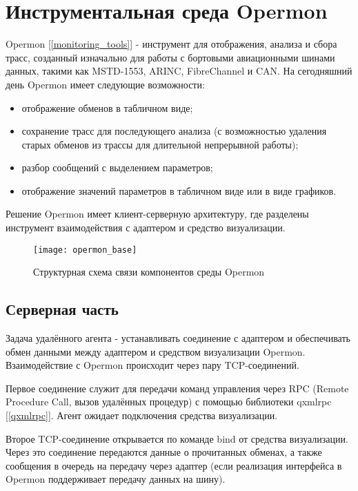 \section{Инструментальная среда Opermon}

Opermon [\ref{monitoring_tools}] - инструмент для отображения, анализа и сбора трасс, созданный изначально для работы с бортовыми авиационными шинами данных, такими как MSTD-1553, ARINC, FibreChannel и CAN. На сегодняшний день Opermon имеет следующие возможности:

\begin{itemize}
 \item отображение обменов в табличном виде;
 \item сохранение трасс для последующего анализа (с возможностью удаления старых обменов из трассы для длительной непрерывной работы);
 \item разбор сообщений с выделением параметров;
 \item отображение значений параметров в табличном виде или в виде графиков.
\end{itemize}

Решение Opermon имеет клиент-серверную архитектуру, где разделены инструмент взаимодействия с адаптером и средство визуализации. 

\begin{figure}[H]
 \centering
 \texttt{[image: opermon\_base]}
 \caption{Структурная схема связи компонентов среды Opermon}
 \label{fig:opermon_base}
\end{figure}

\subsection{Серверная часть}

\label{agent_base}

Задача удалённого агента - устанавливать соединение с адаптером и обеспечивать обмен данными между адаптером и средством визуализации Opermon. Взаимодействие с Opermon происходит через пару TCP-соединений.

Первое соединение служит для передачи команд управления через RPC (Remote Procedure Call, вызов удалённых процедур) с помощью библиотеки qxmlrpc [\ref{qxmlrpc}]. Агент ожидает подключения средства визуализации.

Второе TCP-соединение открывается по команде bind от средства визуализации. Через это соединение передаются данные о прочитанных обменах, а также сообщения в очередь на передачу через адаптер (если реализация интерфейса в Opermon поддерживает передачу данных на шину).

